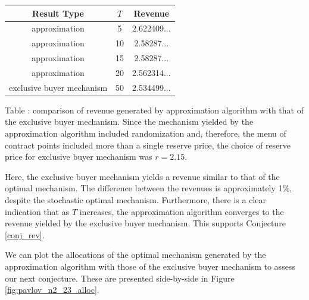 \begin{center}
    \begin{tabular}{ |c|c|c| } 
    \hline
    Result Type & $T$ & Revenue \\
    \hline
    \hline
    approximation & 5 & 2.622409... \\ 
    approximation & 10 & 2.58287... \\ 
    approximation & 15 & 2.58287... \\ 
    approximation & 20 & 2.562314... \\ 
    exclusive buyer mechanism & 50 & 2.534499... \\
    \hline
    \end{tabular}

    \vspace{1mm}
    \raggedright{\small {\sc Table \thefig\label{table:pavlov_23_n2_revenue}:} comparison of revenue generated by approximation algorithm with that of the exclusive buyer mechanism. Since the mechanism yielded by the approximation algorithm included randomization and, therefore, the menu of contract points included more than a single reserve price, the choice of reserve price for exclusive buyer mechanism was $r=2.15$.}
\end{center}

\noindent Here, the exclusive buyer mechanism yields a revenue similar to that of the optimal mechanism. The difference between the revenues is approximately 1\%, despite the stochastic optimal mechanism. Furthermore, there is a clear indication that as $T$ increases, the approximation algorithm converges to the revenue yielded by the exclusive buyer mechanism. This supports Conjecture \ref{conj_rev}.

We can plot the allocations of the optimal mechanism generated by the approximation algorithm with those of the exclusive buyer mechanism to assess our next conjecture. These are presented side-by-side in Figure \ref{fig:pavlov_n2_23_alloc}.

